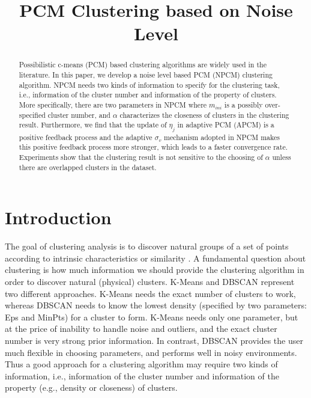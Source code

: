 \documentclass[journal]{IEEEtran}
\date{}
\title{PCM Clustering based on Noise Level}
\theoremstyle{definition}
\begin{document}
\maketitle
\begin{abstract}
Possibilistic c-means (PCM) based clustering algorithms are widely used in the literature. In this paper, we develop a noise level based PCM (NPCM) clustering algorithm. NPCM needs two kinds of information to specify for the clustering task, i.e., information of the cluster number and information of the property of clusters. More specifically, there are two parameters in NPCM where $m_{ini}$ is a possibly over-specified cluster number, and $\alpha$ characterizes the closeness of clusters in the clustering result. Furthermore, we find that the update of $\eta_j$ in adaptive PCM (APCM) is a positive feedback process and the adaptive $\sigma_v$ mechanism adopted in NPCM makes this positive feedback process more stronger, which leads to a faster convergence rate. Experiments show that the clustering result is not sensitive to the choosing of $\alpha$ unless there are overlapped clusters in the dataset.
\end{abstract}
\section{Introduction}
\label{sec-1}
The goal of clustering analysis is to discover natural groups of a set of points according to intrinsic characteristics or similarity \cite{jain_data_2010}. A fundamental question about clustering is how much information we should provide the clustering algorithm in order to discover natural (physical) clusters. K-Means \cite{jain_data_2010} and DBSCAN \cite{ester_density-based_1996} represent two different approaches. K-Means needs the exact number of clusters to work, whereas DBSCAN needs to know the lowest density (specified by two parameters: Eps and MinPts) for a cluster to form. K-Means needs only one parameter, but at the price of inability to handle noise and outliers, and the exact cluster number is very strong prior information. In contrast, DBSCAN provides the user much flexible in choosing parameters, and performs well in noisy environments.
Thus a good approach for a clustering algorithm may require two kinds of information, i.e., information of the cluster number and information of the property (e.g., density or closeness) of clusters.
\end{document}
